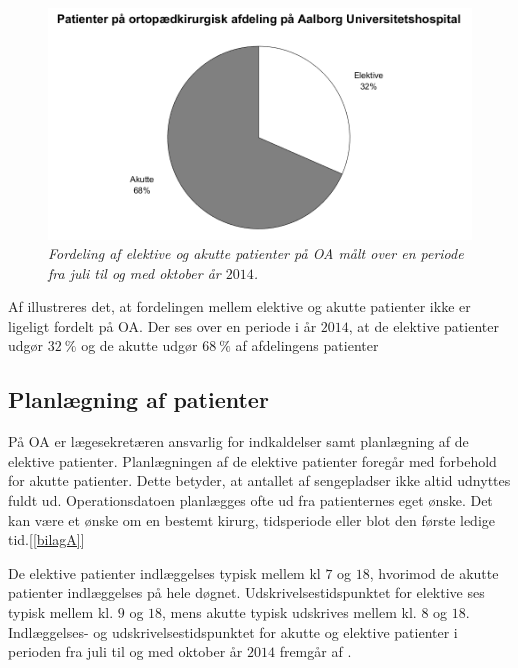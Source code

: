 \begin{figure}[H]
	\flushleft 
	\centering
	\includegraphics[scale=0.55]{figures/elektivvsakut.png}
	\flushleft
	\caption{\textit{Fordeling af elektive og akutte patienter på OA målt over en periode fra juli til og med oktober år $2014$.}\cite{REOS}}
	\label{elektivvsakut}
	\end{figure}

\noindent
Af  illustreres det, at fordelingen mellem elektive og akutte patienter ikke er ligeligt fordelt på OA. Der ses over en periode i år $2014$, at de elektive patienter udgør $32~\%$ og de akutte udgør $68~\%$ af afdelingens patienter \\

\subsection{Planlægning af patienter} \label{book}
På OA er lægesekretæren ansvarlig for indkaldelser samt planlægning af de elektive patienter. Planlægningen af de elektive patienter foregår med forbehold for akutte patienter. Dette betyder, at antallet af sengepladser ikke altid udnyttes fuldt ud. Operationsdatoen planlægges ofte ud fra patienternes eget ønske. Det kan være et ønske om en bestemt kirurg, tidsperiode eller blot den første ledige tid.[\ref{bilagA}]

\noindent
De elektive patienter indlæggelses typisk mellem kl $7$ og $18$, hvorimod de akutte patienter indlæggelses på hele døgnet. Udskrivelsestidspunktet for elektive ses typisk mellem kl. $9$ og $18$, mens akutte typisk udskrives mellem kl. $8$ og $18$. Indlæggelses- og udskrivelsestidspunktet for akutte og elektive patienter i perioden fra juli til og med oktober år $2014$ fremgår af .\cite{REOS}


